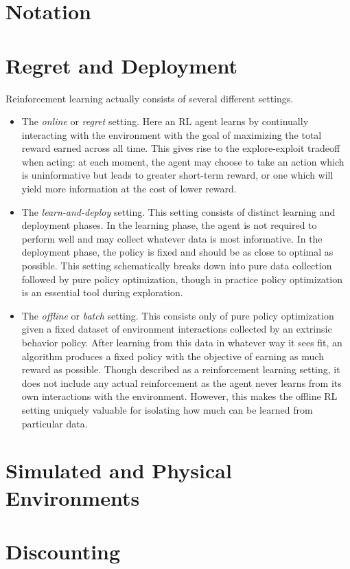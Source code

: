\section{Notation}


\section{Regret and Deployment} \label{sec:regret-deployment}

Reinforcement learning actually consists of several different settings.

\begin{itemize}
    \item The \emph{online} or \emph{regret} setting.
    Here an RL agent learns by continually interacting with the environment with the goal of maximizing the total reward earned across all time. This gives rise to the explore-exploit tradeoff when acting: at each moment, the agent may choose to take an action which is uninformative but leads to greater short-term reward, or one which will yield more information at the cost of lower reward.
    \item The \emph{learn-and-deploy} setting.
    This setting consists of distinct learning and deployment phases. In the learning phase, the agent is not required to perform well and may collect whatever data is most informative. In the deployment phase, the policy is fixed and should be as close to optimal as possible. This setting schematically breaks down into pure data collection followed by pure policy optimization, though in practice policy optimization is an essential tool during exploration.
    \item The \emph{offline} or \emph{batch} setting.
    This consists only of pure policy optimization given a fixed dataset of environment interactions collected by an extrinsic behavior policy. After learning from this data in whatever way it sees fit, an algorithm produces a fixed policy with the objective of earning as much reward as possible. Though described as a reinforcement learning setting, it does not include any actual reinforcement as the agent never learns from its own interactions with the environment. However, this makes the offline RL setting uniquely valuable for isolating how much can be learned from particular data.
\end{itemize}



\section{Simulated and Physical Environments}

\section{Discounting}


